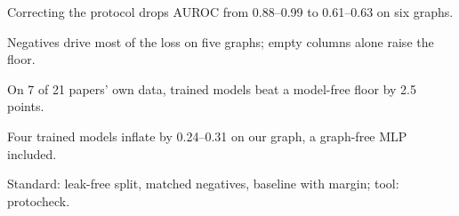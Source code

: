 \documentclass[review]{elsarticle}
\begin{document}
\begin{frontmatter}
\begin{abstract}
\textbf{Conclusion:} The inflation follows the evaluation protocol, not the model or dataset. We propose a minimum reporting standard (a leak-free edge split, matched negative sampling, and a model-free baseline with its margin stated); \texttt{protocheck} verifies it.
\end{abstract}
\begin{highlights}
\item Correcting the protocol drops AUROC from 0.88--0.99 to 0.61--0.63 on six graphs.
\item Negatives drive most of the loss on five graphs; empty columns alone raise the floor.
\item On 7 of 21 papers' own data, trained models beat a model-free floor by 2.5 points.
\item Four trained models inflate by 0.24--0.31 on our graph, a graph-free MLP included.
\item Standard: leak-free split, matched negatives, baseline with margin; tool: protocheck.
\end{highlights}

\end{frontmatter}
\end{document}
